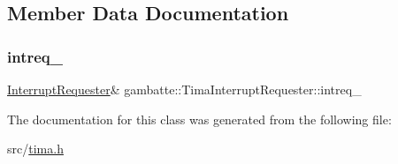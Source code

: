 \subsection{Member Data Documentation}
\mbox{\label{classgambatte_1_1TimaInterruptRequester_a56e706d1df000a87c2a1831d5b5e6400}} 
\subsubsection{\texorpdfstring{intreq\+\_\+}{intreq\_}}
{\footnotesize\ttfamily \hyperlink{classgambatte_1_1InterruptRequester}{Interrupt\+Requester}\& gambatte\+::\+Tima\+Interrupt\+Requester\+::intreq\+\_\+\hspace{0.3cm}{\ttfamily [private]}}



The documentation for this class was generated from the following file\+:\begin{DoxyCompactItemize}
\item 
src/\hyperlink{tima_8h}{tima.\+h}\end{DoxyCompactItemize}
